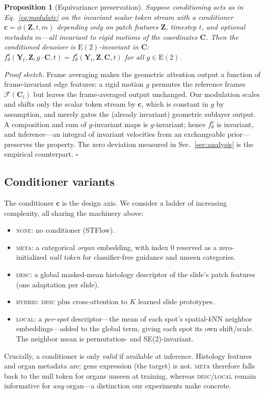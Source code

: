 \documentclass[10pt,twocolumn,letterpaper]{article}
\newtheorem{proposition}{Proposition}
\begin{document}
\begin{proposition}[Equivariance preservation]
\label{prop:equi}
Suppose conditioning acts as in Eq.~\eqref{eq:modulate} on the invariant scalar token stream with a
conditioner $\mathbf{c}=\phi(\mathbf{Z},t,m)$ depending only on patch features $\mathbf{Z}$,
timestep $t$, and optional metadata $m$---all invariant to rigid motions of the coordinates
$\mathbf{C}$. Then the conditioned denoiser is $\mathrm{E}(2)$-invariant in $\mathbf{C}$:
$f^{\mathbf{c}}_\theta(\mathbf{Y}_t,\mathbf{Z},g\!\cdot\!\mathbf{C},t)=
f^{\mathbf{c}}_\theta(\mathbf{Y}_t,\mathbf{Z},\mathbf{C},t)$ for all $g\in\mathrm{E}(2)$.
\end{proposition}
\noindent\emph{Proof sketch.} Frame averaging makes the geometric attention output a function of
frame-invariant edge features: a rigid motion $g$ permutes the reference frames
$\mathcal{F}(\mathbf{C}_i)$ but leaves the frame-averaged output unchanged. Our modulation scales
and shifts only the scalar token stream by $\mathbf{c}$, which is constant in $g$ by assumption,
and merely gates the (already invariant) geometric sublayer output. A composition and sum of
$g$-invariant maps is $g$-invariant; hence $f^{\mathbf{c}}_\theta$ is invariant, and inference---an
integral of invariant velocities from an exchangeable prior---preserves the property. The zero
deviation measured in Sec.~\ref{sec:analysis} is the empirical counterpart. \hfill$\square$

\subsection{Conditioner variants}
The conditioner $\mathbf{c}$ is the design axis. We consider a ladder of increasing complexity,
all sharing the machinery above:
\begin{itemize}
\item \textsc{none}: no conditioner (STFlow).
\item \textsc{meta}: a categorical \emph{organ} embedding, with index $0$ reserved as a
zero-initialized \emph{null token} for classifier-free guidance and unseen categories.
\item \textsc{desc}: a global masked-mean histology descriptor of the slide's patch features
(one adaptation per slide).
\item \textsc{hybrid}: \textsc{desc} plus cross-attention to $K$ learned slide prototypes.
\item \textsc{local}: a \emph{per-spot} descriptor---the mean of each spot's spatial-$k$NN
neighbor embeddings---added to the global term, giving each spot its own shift/scale. The
neighbor mean is permutation- and SE(2)-invariant.
\end{itemize}
Crucially, a conditioner is only \emph{valid} if available at inference. Histology features and
organ metadata are; gene expression (the target) is not. \textsc{meta} therefore falls back to
the null token for organs unseen at training, whereas \textsc{desc}/\textsc{local} remain
informative for \emph{any} organ---a distinction our experiments make concrete.
\end{document}

